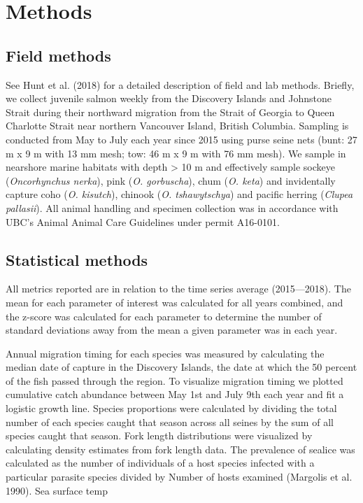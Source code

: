 \documentclass[fleqn,10pt]{wlpeerj} %
\begin{document}
\section*{Methods}\label{methods}

\subsection*{Field methods}\label{field-methods}

See Hunt et al. (2018) for a detailed description of field and lab
methods. Briefly, we collect juvenile salmon weekly from the Discovery
Islands and Johnstone Strait during their northward migration from the
Strait of Georgia to Queen Charlotte Strait near northern Vancouver
Island, British Columbia. Sampling is conducted from May to July each
year since 2015 using purse seine nets (bunt: 27 m x 9 m with 13 mm
mesh; tow: 46 m x 9 m with 76 mm mesh). We sample in nearshore marine
habitats with depth \textgreater{} 10 m and effectively sample sockeye
(\emph{Oncorhynchus nerka}), pink (\emph{O. gorbuscha}), chum (\emph{O.
keta}) and invidentally capture coho (\emph{O. kisutch}), chinook
(\emph{O. tshawytschya}) and pacific herring (\emph{Clupea pallasii}).
All animal handling and specimen collection was in accordance with UBC's
Animal Animal Care Guidelines under permit A16-0101.

\subsection*{Statistical methods}\label{statistical-methods}

All metrics reported are in relation to the time series average
(2015---2018). The mean for each parameter of interest was calculated
for all years combined, and the z-score was calculated for each
parameter to determine the number of standard deviations away from the
mean a given parameter was in each year.

Annual migration timing for each species was measured by calculating the
median date of capture in the Discovery Islands, the date at which the
50 percent of the fish passed through the region. To visualize migration
timing we plotted cumulative catch abundance between May 1st and July
9th each year and fit a logistic growth line. Species proportions were
calculated by dividing the total number of each species caught that
season across all seines by the sum of all species caught that season.
Fork length distributions were visualized by calculating density
estimates from fork length data. The prevalence of sealice was
calculated as the number of individuals of a host species infected with
a particular parasite species divided by Number of hosts examined
(Margolis et al. 1990). Sea surface temp
\end{document}
